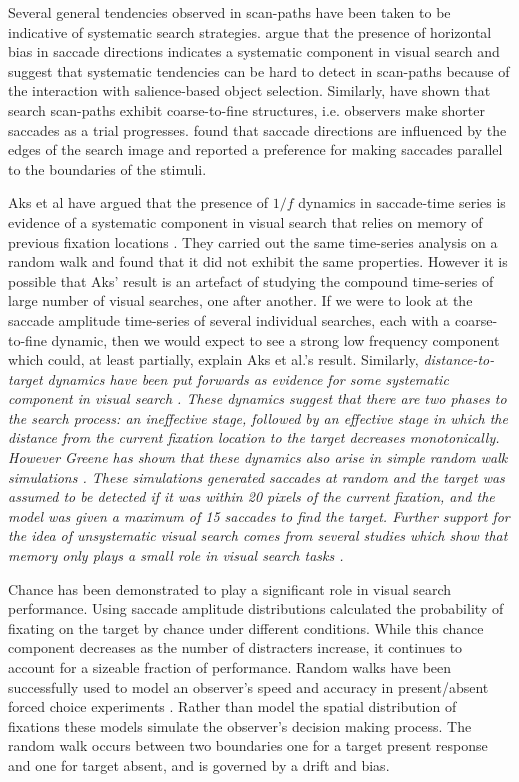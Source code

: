 \par
Several general tendencies observed in scan-paths have been taken to be indicative of systematic search strategies. \cite{gilchrist-harvey2006} argue that the presence of horizontal bias in saccade directions indicates a systematic component in visual search and suggest that systematic tendencies can be hard to detect in scan-paths because of the interaction with salience-based object selection. Similarly, \cite{over2007} have shown that search scan-paths exhibit coarse-to-fine structures, i.e. observers make shorter saccades as a trial progresses. \cite{over2003} found that saccade directions are influenced by the edges of the search image and reported a preference for making saccades parallel to the boundaries of the stimuli. 
\par
Aks et al have argued that the presence of  $1/f$ dynamics in saccade-time series is evidence of a systematic component in visual search that relies on memory of previous fixation locations \citep{aks2002, aks2005}. They carried out the same time-series analysis on a random walk and found that it did not exhibit the same properties. However it is possible that Aks' result is an artefact of studying the compound time-series of large number of visual searches, one after another. If we were to look at the saccade amplitude time-series of several individual searches, each with a coarse-to-fine dynamic, then we would expect to see a strong low frequency component which could, at least partially, explain Aks et al.'s result. Similarly, \itshape distance-to-target \normalfont dynamics have been put forwards as evidence for some systematic component in visual search \citep{tseng-li2004}. These dynamics suggest that there are two phases to the search process: an ineffective stage, followed by an effective stage in which the distance from the current fixation location to the target decreases monotonically. However Greene has shown that these dynamics also arise in simple random walk simulations \citep{greene2008}. These simulations generated saccades at random and the target was assumed to be detected if it was within 20 pixels of the current fixation, and the model was given a maximum of 15 saccades to find the target. Further support for the idea of unsystematic visual search comes from several studies which show that memory only plays a small role in visual search tasks \citep{horowitz-wolfe1998, horowitz-wolfe2001, kuna2008, wolfe2000}. 
\par
Chance has been demonstrated to play a significant role in visual search performance. Using saccade amplitude distributions \cite{motter-holsapple2001} calculated the probability of fixating on the target by chance under different conditions. While this chance component decreases as the number of distracters increase, it continues to account for a sizeable fraction of performance. Random walks have been successfully used to model an observer's speed and accuracy in present/absent forced choice experiments \citep{stone1960, reeves2005}. Rather than model the spatial distribution of fixations these models simulate the observer's decision making process. The random walk occurs between two boundaries one for a target present response and one for target absent, and is governed by a drift and bias. 
